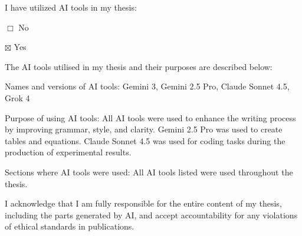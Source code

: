 I have utilized AI tools in my thesis:

\hspace{1.8em}$\Box$ No

\hspace{1.8em}$\boxtimes$ Yes

The AI tools utilised in my thesis and their purposes are described below:

Names and versions of AI tools: Gemini 3, Gemini 2.5 Pro, Claude Sonnet 4.5, Grok 4

Purpose of using AI tools: All AI tools were used to enhance the writing process by improving grammar, style, and clarity. Gemini 2.5 Pro was used to create tables and equations. Claude Sonnet 4.5 was used for coding tasks during the production of experimental results.

Sections where AI tools were used: All AI tools listed were used throughout the thesis.

I acknowledge that I am fully responsible for the entire content of my thesis, including the parts generated by AI, and accept accountability for any violations of ethical standards in publications.